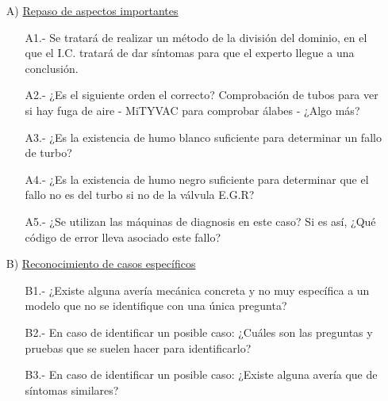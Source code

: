 \documentclass[a4paper,12pt]{article}
\begin{document}
 \begin{itemize}
 \item[A)] \underline{Repaso de aspectos importantes}
 \begin{itemize}
 \item[A1.-] Se tratará de realizar un método de la división del dominio, en el que el I.C. tratará de dar síntomas para que el experto llegue a una conclusión. 
 \item[A2.-] ¿Es el siguiente orden el correcto? Comprobación de tubos para ver si hay fuga de aire - MiTYVAC para comprobar álabes - ¿Algo más?
 \item[A3.-] ¿Es la existencia de humo blanco suficiente para determinar un fallo de turbo?
 \item[A4.-] ¿Es la existencia de humo negro suficiente para determinar que el fallo no es del turbo si no de la válvula E.G.R?
 \item[A5.-] ¿Se utilizan las máquinas de diagnosis en este caso? Si es así, ¿Qué código de error lleva asociado este fallo?
 \end{itemize}
 \item[B)] \underline{Reconocimiento de casos específicos}
 \begin{itemize}
 \item[B1.-] ¿Existe alguna avería mecánica concreta y no muy específica a un modelo que no se identifique con una única pregunta?
 \item[B2.-] En caso de identificar un posible caso: ¿Cuáles son las preguntas y pruebas que se suelen hacer para identificarlo?
 \item[B3.-] En caso de identificar un posible caso: ¿Existe alguna avería que de síntomas similares?
 \end{itemize}
 \end{itemize}
 
\end{document}

